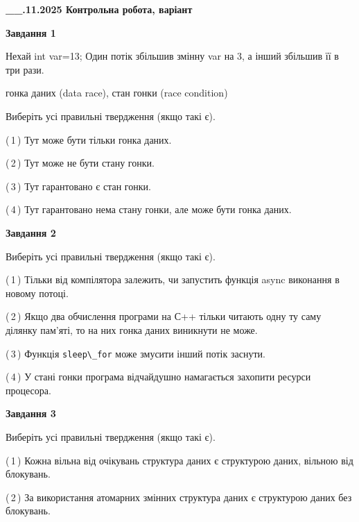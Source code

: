 \documentclass[12pt, ukrainian]{article}
\def\code#1{\Verb!#1!}
\begin{document}
\begin {large}

\textbf{\_\_.11.2025 Контрольна робота, варіант  }\par


{

\begin{center}
\textbf{Завдання 1}
\end{center}
Нехай int var=13; Один потік збільшив змінну var на 3, а інший збільшив її в три рази.

гонка даних (data race), стан гонки (race condition)

Виберіть усі правильні твердження (якщо такі є).\par
\vspace{2mm}
(\,1\,) Тут може бути тільки гонка даних.%

(\,2\,) Тут може не бути стану гонки.%

(\,3\,) Тут гарантовано є стан гонки.%

(\,4\,) Тут гарантовано нема стану гонки, але може бути гонка даних.%



\begin{center}
\textbf{Завдання 2}
\end{center}
Виберіть усі правильні твердження (якщо такі є).\par
\vspace{2mm}

(\,1\,) Тільки від компілятора залежить, чи запустить функція async виконання в новому потоці.%

(\,2\,) Якщо два обчислення програми на С++ тільки читають одну ту саму ділянку пам'яті, то на них гонка даних  виникнути не може.%

(\,3\,) Функція \code{sleep\_for} може змусити інший потік заснути.%

(\,4\,) У стані гонки програма відчайдушно намагається захопити ресурси процесора.%



\begin{center}
\textbf{Завдання 3}
\end{center}
Виберіть усі правильні твердження (якщо такі є).\par
\vspace{2mm}

(\,1\,) Кожна вільна від очікувань структура даних є структурою даних, вільною від блокувань.%

(\,2\,) За використання атомарних змінних структура даних є структурою даних без блокувань.%

}
\end{large}
\end{document}
